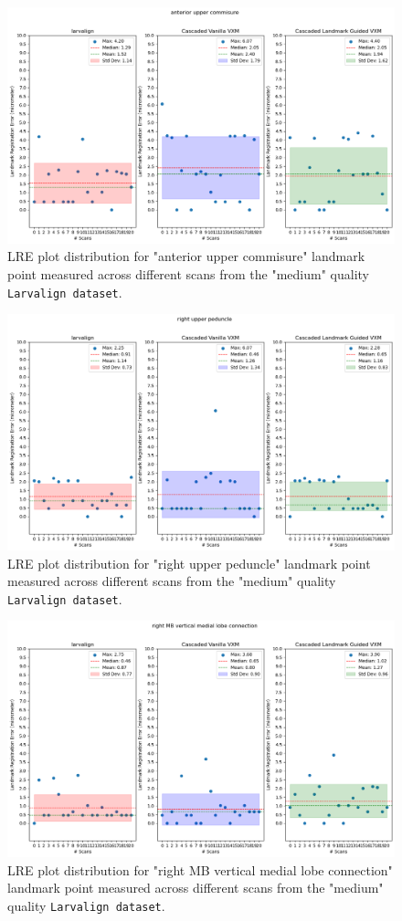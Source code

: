 \documentclass{book}
\begin{document}
	\begin{figure}[h!]
		\centering
		\includegraphics[width=0.75\columnwidth]{resources/chapter5_fresh/output/anterior upper commisure.png}
		\caption{LRE plot distribution for "anterior upper commisure" landmark point measured across different scans from the "medium" quality \texttt{Larvalign dataset}.}
		\label{fig:landmark18}
	\end{figure}
	
	\begin{figure}[h!]
		\centering
		\includegraphics[width=0.75\columnwidth]{resources/chapter5_fresh/output/right upper peduncle.png}
		\caption{LRE plot distribution for "right upper peduncle" landmark point measured across different scans from the "medium" quality \texttt{Larvalign dataset}.}
		\label{fig:landmark19}
	\end{figure}
	
	\begin{figure}[h!]
		\centering
		\includegraphics[width=0.75\columnwidth]{resources/chapter5_fresh/output/right MB vertical medial lobe connection.png}
		\caption{LRE plot distribution for "right MB vertical medial lobe connection" landmark point measured across different scans from the "medium" quality \texttt{Larvalign dataset}.}
		\label{fig:landmark20}
	\end{figure}
	
\end{document}
